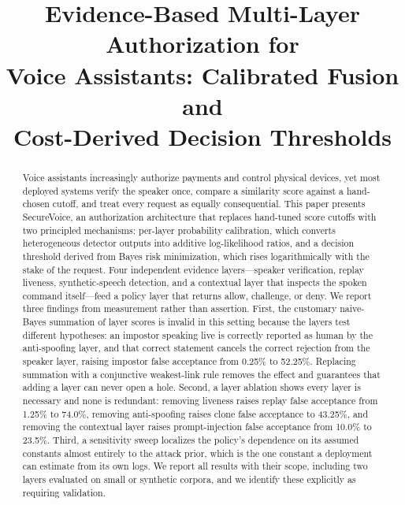 \documentclass[conference]{IEEEtran}
\begin{document}
\title{Evidence-Based Multi-Layer Authorization for\\ Voice Assistants: Calibrated Fusion and\\ Cost-Derived Decision Thresholds}

\author{
}

\maketitle

\begin{abstract}
Voice assistants increasingly authorize payments and control physical devices,
yet most deployed systems verify the speaker once, compare a similarity score
against a hand-chosen cutoff, and treat every request as equally consequential.
This paper presents SecureVoice, an authorization architecture that replaces
hand-tuned score cutoffs with two principled mechanisms: per-layer probability
calibration, which converts heterogeneous detector outputs into additive
log-likelihood ratios, and a decision threshold derived from Bayes risk
minimization, which rises logarithmically with the stake of the request. Four
independent evidence layers---speaker verification, replay liveness,
synthetic-speech detection, and a contextual layer that inspects the spoken
command itself---feed a policy layer that returns allow, challenge, or deny.
We report three findings from measurement rather than assertion. First, the
customary naive-Bayes summation of layer scores is invalid in this setting
because the layers test different hypotheses: an impostor speaking live is
correctly reported as human by the anti-spoofing layer, and that correct
statement cancels the correct rejection from the speaker layer, raising
impostor false acceptance from 0.25\% to 52.25\%. Replacing summation with a
conjunctive weakest-link rule removes the effect and guarantees that adding a
layer can never open a hole. Second, a layer ablation shows every layer is
necessary and none is redundant: removing liveness raises replay false
acceptance from 1.25\% to 74.0\%, removing anti-spoofing raises clone false
acceptance to 43.25\%, and removing the contextual layer raises prompt-injection
false acceptance from 10.0\% to 23.5\%. Third, a sensitivity sweep localizes the
policy's dependence on its assumed constants almost entirely to the attack
prior, which is the one constant a deployment can estimate from its own logs.
We report all results with their scope, including two layers evaluated on small
or synthetic corpora, and we identify these explicitly as requiring
validation.
\end{abstract}
\end{document}
